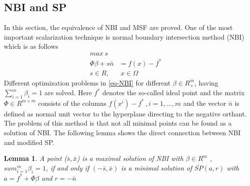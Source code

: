 \documentclass[12pt,a4paper]{article}
\numberwithin{equation}{section}
\begin{document}
\subsection{NBI and SP}
In this section, the equivalence of NBI and MSF are proved. 
One of the most important scalarization technique is normal boundary intersection method (NBI) which is as follows
\begin{equation}  \label{eq-NBI}
\begin{split}
max \ s  \\
\Phi\beta+s\bar{n}&=f(x)-f^{*}   \\
s \in R ,& \ x\in\Omega
\end{split}
\end{equation}
Different optimization problems in \eqref{eq-NBI} for different  $\beta\in R^{m}_{+}$, 
having $\sum_{i=1}^{m} \beta_{i}=1$ are solved. Here $f^{*}$  denotes the so-called ideal point and the 
matrix $\Phi\in R^{m\times m}$ consists of the columns $f(x^i)-f^{*} \ ,i=1,\hdots,m$ and the vector $\bar{n}$ is defined as normal unit vector to the hyperplane directing to the negative orthant.
The problem of this method is that not all minimal points can be found as a solution of NBI. The following lemma shows the direct connection between NBI and modified SP.
\renewcommand{\thesubsection}{\arabic{subsection}}
\newtheorem{NBISPLemma}{Lemma}[subsection]
\begin{NBISPLemma}{\citep{Eichfelder2008}}\label{NBISP}
A point ($\bar{s},\bar{x}$) is a maximal solution of NBI with $\beta \in R^{m}$ , $sum_{i=1}^{m}\beta_{i}=1$, if and only if $(-\bar{s},\bar{x})$ is a minimal solution of $\overline{SP}(a,r)$ with $a=f^{*}+\Phi\beta$ and $r=-\bar{n}$
\end{NBISPLemma}
\end{document}
